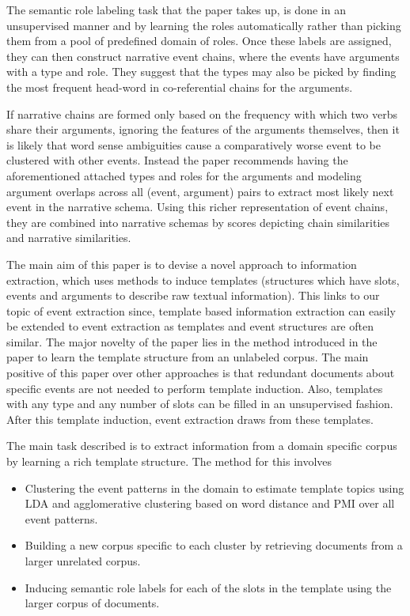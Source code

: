 The semantic role labeling task that the paper takes up, is done in an unsupervised manner and by learning the roles automatically rather than picking them from a pool of predefined domain of roles. Once these labels are assigned, they can then construct narrative event chains, where the events have arguments with a type and role.  They suggest that the types may also be picked by finding the most frequent head-word in co-referential chains for the arguments.

If narrative chains are formed only based on the frequency with which two verbs share their arguments, ignoring the features of the arguments themselves, then it is likely that word sense ambiguities cause a comparatively worse event to be clustered with other events. Instead the paper recommends having the aforementioned attached types and roles for the arguments and modeling argument overlaps across all (event, argument) pairs to extract most likely next event in the narrative schema. Using this richer representation of event chains, they are combined into narrative schemas by scores depicting chain similarities and narrative similarities.\\


The main aim of this paper is to devise a novel approach to information extraction, which uses methods to induce templates (structures which have slots, events and arguments to describe raw textual information). This links to our topic of event extraction since, template based information extraction can easily be extended to event extraction as templates and event structures are often similar. The major novelty of the paper lies in the method introduced in the paper to learn the template structure from an unlabeled corpus. The main positive of this paper over other approaches is that redundant documents about specific events are not needed to perform template induction. Also, templates with any type and any number of slots can be filled in an unsupervised fashion. After this template induction, event extraction draws from these templates.

The main task described is to extract information from a domain specific corpus by learning a rich template structure. The method for this involves
\begin{itemize}
\item Clustering the event patterns in the domain to estimate template topics using LDA and agglomerative clustering based on word distance and PMI over all event patterns. 
\item Building a new corpus specific to each cluster by retrieving documents from a larger unrelated corpus.
\item Inducing semantic role labels for each of the slots in the template using the larger corpus of documents.
\end{itemize}

